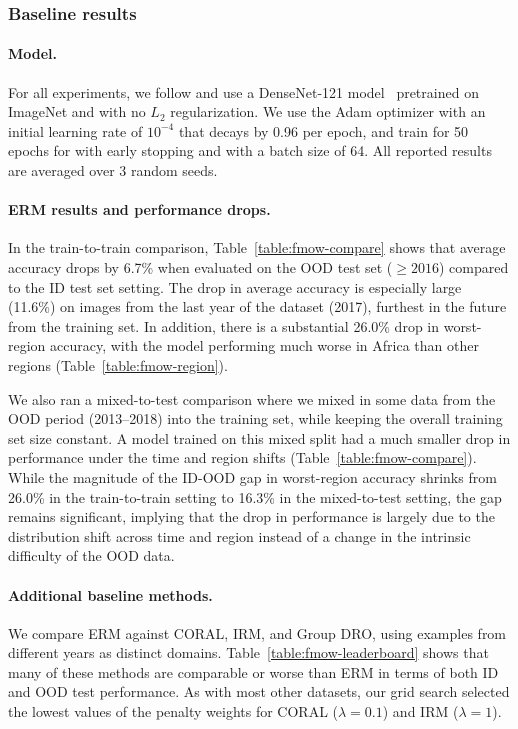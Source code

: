\subsubsection{Baseline results}
\paragraph{Model.} For all experiments, we follow \citet{christie2018fmow} and use a DenseNet-121 model~\citep{huang2017densely} pretrained on ImageNet and with no $L_2$ regularization.
We use the Adam optimizer \citep{kingma2014adam} with an initial learning rate of $10^{-4}$ that decays by 0.96 per epoch, and train for 50 epochs for with early stopping and with a batch size of 64.
All reported results are averaged over 3 random seeds.

\paragraph{ERM results and performance drops.}
In the train-to-train comparison, Table~\ref{table:fmow-compare} shows that average accuracy drops by 6.7\% when evaluated on the OOD test set ($\geq 2016$) compared to the ID test set setting.
The drop in average accuracy is especially large (11.6\%) on images from the last year of the dataset (2017), furthest in the future from the training set.
In addition, there is a substantial 26.0\% drop in worst-region accuracy, with the model performing much worse in Africa than other regions (Table~\ref{table:fmow-region}).

We also ran a mixed-to-test comparison where we mixed in some data from the OOD period (2013--2018) into the training set, while keeping the overall training set size constant.
A model trained on this mixed split had a much smaller drop in performance under the time and region shifts (Table~\ref{table:fmow-compare}).
While the magnitude of the ID-OOD gap in worst-region accuracy shrinks from 26.0\% in the train-to-train setting to 16.3\% in the mixed-to-test setting, the gap remains significant, implying that the drop in performance is largely due to the distribution shift across time and region instead of  a change in the intrinsic difficulty of the OOD data.

\paragraph{Additional baseline methods.}
We compare ERM against CORAL, IRM, and Group DRO, using examples from different years as distinct domains. Table~\ref{table:fmow-leaderboard} shows that many of these methods are comparable or worse than ERM in terms of both ID and OOD test performance.
As with most other datasets, our grid search selected the lowest values of the penalty weights for CORAL ($\lambda = 0.1$) and IRM ($\lambda = 1$).


